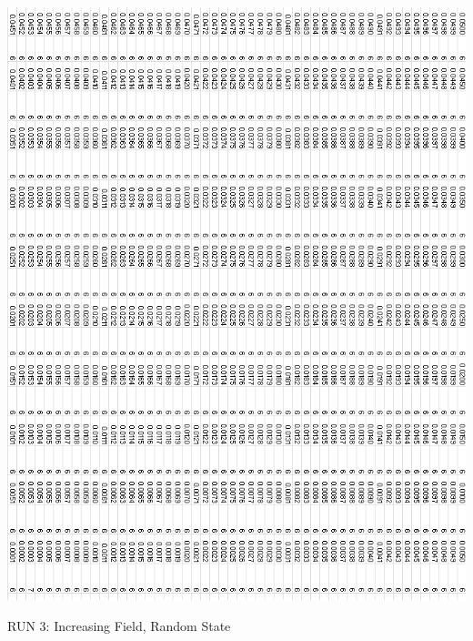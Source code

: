 \documentclass{article}
\begin{document}
\pagebreak
\begin{center}
 \includegraphics[keepaspectratio,scale=0.83]{005to000SpinChart.png}
\end{center}
\pagebreak

\thispagestyle{plain}
\begin{center}
\LARGE
RUN 3: Increasing Field, Random State
\end{center}
\end{document}
